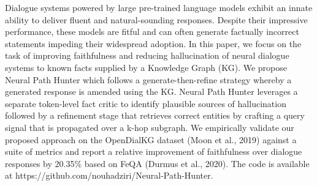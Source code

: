 Dialogue systems powered by large pre-trained language models exhibit an innate ability to deliver fluent and natural-sounding responses. Despite their impressive performance, these models are fitful and can often generate factually incorrect statements impeding their widespread adoption. In this paper, we focus on the task of improving faithfulness and reducing hallucination of neural dialogue systems to known facts supplied by a Knowledge Graph (KG). We propose  Neural Path Hunter which follows a generate-then-refine strategy whereby a generated response is amended using the KG. Neural Path Hunter leverages a separate token-level fact critic to identify plausible sources of hallucination followed by a refinement stage that retrieves correct entities by crafting a query signal that is propagated over a k-hop subgraph. We empirically validate our proposed approach on the OpenDialKG dataset (Moon et al., 2019) against a suite of metrics and report a relative improvement of faithfulness over dialogue responses by 20.35\% based on FeQA (Durmus et al., 2020). The code is available at https://github.com/nouhadziri/Neural-Path-Hunter.
